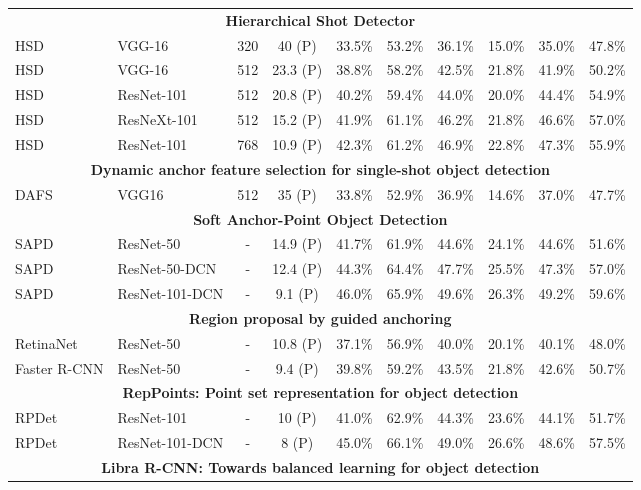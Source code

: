 \documentclass[10pt,twocolumn,letterpaper]{article}
\begin{document}
\begin{table*}[h]
\begin{threeparttable}[h]
\begin{tabular}{llcccccccc}
			\midrule
			\multicolumn{10}{c}{\textbf{Hierarchical Shot Detector \cite{cao2019hierarchical}}} \\
			\rowcolor{cyan}HSD & VGG-16 & 320 & 40 (P) & 33.5\% & 53.2\% & 36.1\% & 15.0\% & 35.0\% & 47.8\% \\
			HSD & VGG-16 & 512 & 23.3 (P) & 38.8\% & 58.2\% & 42.5\% & 21.8\% & 41.9\% & 50.2\% \\
			HSD & ResNet-101 & 512 & 20.8 (P) & 40.2\% & 59.4\% & 44.0\% & 20.0\% & 44.4\% & 54.9\% \\
			HSD & ResNeXt-101 & 512 & 15.2 (P) & 41.9\% & 61.1\% & 46.2\% & 21.8\% & 46.6\% & 57.0\% \\
			HSD & ResNet-101 & 768 & 10.9 (P) & 42.3\% & 61.2\% & 46.9\% & 22.8\% & 47.3\% & 55.9\% \\
			\midrule
			\multicolumn{10}{c}{\textbf{Dynamic anchor feature selection for single-shot object detection} \cite{li2019dynamic}} \\
			\rowcolor{cyan} DAFS & VGG16 & 512 & 35 (P) & 33.8\% & 52.9\% & 36.9\% & 14.6\% & 37.0\% & 47.7\% \\
			\midrule
			\midrule
			\multicolumn{10}{c}{\textbf{Soft Anchor-Point Object Detection} \cite{zhu2019soft}} \\
			SAPD & ResNet-50 & - & 14.9 (P) & 41.7\% & 61.9\% & 44.6\% & 24.1\% & 44.6\% & 51.6\% \\
			SAPD & ResNet-50-DCN & - & 12.4 (P) & 44.3\% & 64.4\% & 47.7\% & 25.5\% & 47.3\% & 57.0\% \\
			SAPD & ResNet-101-DCN & - & 9.1 (P) & 46.0\% & 65.9\% & 49.6\% & 26.3\% & 49.2\% & 59.6\% \\
			\midrule
			\multicolumn{10}{c}{\textbf{Region proposal by guided anchoring} \cite{wang2019region}} \\
			RetinaNet & ResNet-50 & - & 10.8 (P) & 37.1\% & 56.9\% & 40.0\% & 20.1\% & 40.1\% & 48.0\% \\
			Faster R-CNN & ResNet-50 & - & 9.4 (P) & 39.8\% & 59.2\% & 43.5\% & 21.8\% & 42.6\% & 50.7\% \\
			\midrule
			\multicolumn{10}{c}{\textbf{RepPoints: Point set representation for object detection} \cite{yang2019reppoints}} \\
			RPDet & ResNet-101 & - & 10 (P) & 41.0\% & 62.9\% & 44.3\% & 23.6\% & 44.1\% & 51.7\% \\
			RPDet & ResNet-101-DCN & - & 8 (P) & 45.0\% & 66.1\% & 49.0\% & 26.6\% & 48.6\% & 57.5\% \\
			\midrule
			\multicolumn{10}{c}{\textbf{Libra R-CNN: Towards balanced learning for object detection} \cite{pang2019libra}} \\

\end{tabular}
\end{threeparttable}
\end{table*}
\end{document}
